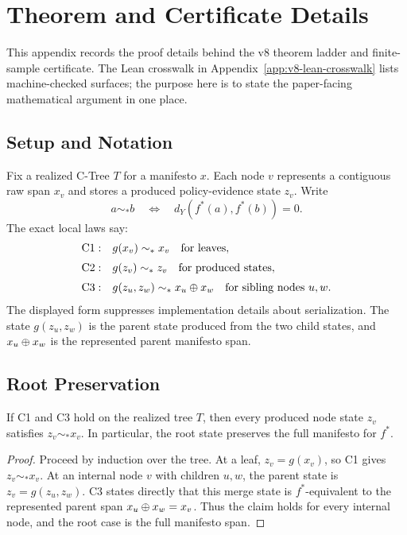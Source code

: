 \section{Theorem and Certificate Details}
\label{app:v8-theorem-certificate-details}
\label{app:v8-full-proofs}

This appendix records the proof details behind the v8 theorem ladder and
finite-sample certificate. The Lean crosswalk in
Appendix~\ref{app:v8-lean-crosswalk} lists machine-checked surfaces; the
purpose here is to state the paper-facing mathematical argument in one place.

\subsection{Setup and Notation}

Fix a realized C-Tree \(T\) for a manifesto \(x\). Each node \(v\) represents
a contiguous raw span \(x_v\) and stores a produced policy-evidence state
\(z_v\). Write
\[
  a\sim_\ast b
  \quad\Longleftrightarrow\quad
  d_Y\!\left(f^\ast(a),f^\ast(b)\right)=0 .
\]
The exact local laws say:
\[
\begin{array}{ll}
\mathrm{C1:} & g(x_v)\sim_\ast x_v \quad\text{for leaves},\\[2mm]
\mathrm{C2:} & g(z_v)\sim_\ast z_v \quad\text{for produced states},\\[2mm]
\mathrm{C3:} & g(z_u,z_w)\sim_\ast x_u\oplus x_w
  \quad\text{for sibling nodes }u,w .
\end{array}
\]
The displayed form suppresses implementation details about serialization. The
state \(g(z_u,z_w)\) is the parent state produced from the two child states,
and \(x_u\oplus x_w\) is the represented parent manifesto span.

\subsection{Root Preservation}

\begin{proposition}
\label{prop:v8-all-node-preservation}
If C1 and C3 hold on the realized tree \(T\), then every produced node state
\(z_v\) satisfies \(z_v\sim_\ast x_v\). In particular, the root state
preserves the full manifesto for \(f^\ast\).
\end{proposition}

\begin{proof}
Proceed by induction over the tree. At a leaf, \(z_v=g(x_v)\), so C1 gives
\(z_v\sim_\ast x_v\). At an internal node \(v\) with children \(u,w\), the
parent state is \(z_v=g(z_u,z_w)\). C3 states directly that this merge state
is \(f^\ast\)-equivalent to the represented parent span
\(x_u\oplus x_w=x_v\). Thus the claim holds for every internal node, and the
root case is the full manifesto span.
\end{proof}


